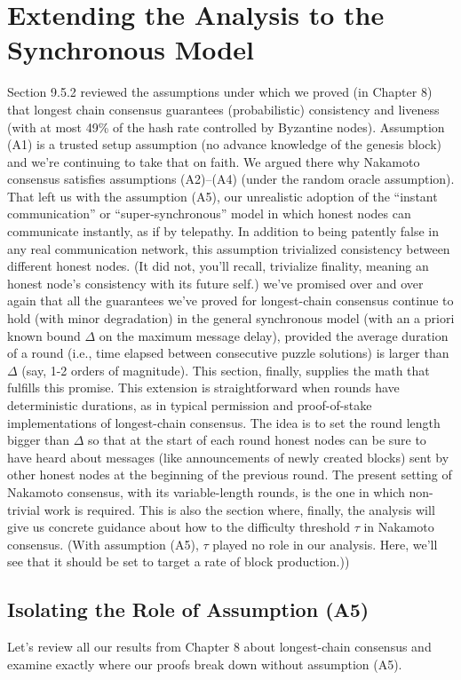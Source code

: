 \section{Extending the Analysis to the Synchronous Model}
Section 9.5.2 reviewed the assumptions under which we proved (in Chapter 8) that longest chain consensus guarantees (probabilistic) consistency and liveness (with at most 49\% of
the hash rate controlled by Byzantine nodes). Assumption (A1) is a trusted setup assumption (no advance knowledge of the genesis block) and we’re continuing to take that on
faith. We argued there why Nakamoto consensus satisfies assumptions (A2)–(A4) (under
the random oracle assumption). That left us with the assumption (A5), our unrealistic adoption of the “instant communication” or “super-synchronous” model in which honest nodes
can communicate instantly, as if by telepathy. In addition to being patently false in any real communication network, this assumption trivialized
consistency between different honest nodes. (It did not, you’ll recall, trivialize finality, meaning an honest
node’s consistency with its future self.)
 we've promised over and over again that
all the guarantees we've proved for longest-chain consensus continue to hold (with minor
degradation) in the general synchronous model (with an a priori known bound $\Delta$ on the
maximum message delay), provided the average duration of a round (i.e., time elapsed between consecutive puzzle solutions) is larger than $\Delta$ (say, 1-2 orders of magnitude). This section, finally, supplies the math that fulfills this promise. This extension is straightforward when rounds have deterministic durations, as in typical permission
and proof-of-stake implementations of longest-chain consensus. The idea is to set the round length bigger
than $\Delta$ so that at the start of each round honest nodes can be sure to have heard about messages (like
announcements of newly created blocks) sent by other honest nodes at the beginning of the previous round.
The present setting of Nakamoto consensus, with its variable-length rounds, is the one in which non-trivial
work is required. This is also the section where,
finally, the analysis will give us concrete guidance about how to the difficulty threshold $\tau$
in Nakamoto consensus. (With assumption (A5), $\tau$ played no role in our analysis.
Here, we’ll see that it should be set to target a rate of block production.))

\subsection{Isolating the Role of Assumption (A5)}
Let’s review all our results from Chapter 8 about longest-chain consensus and examine exactly
where our proofs break down without assumption (A5).\\

